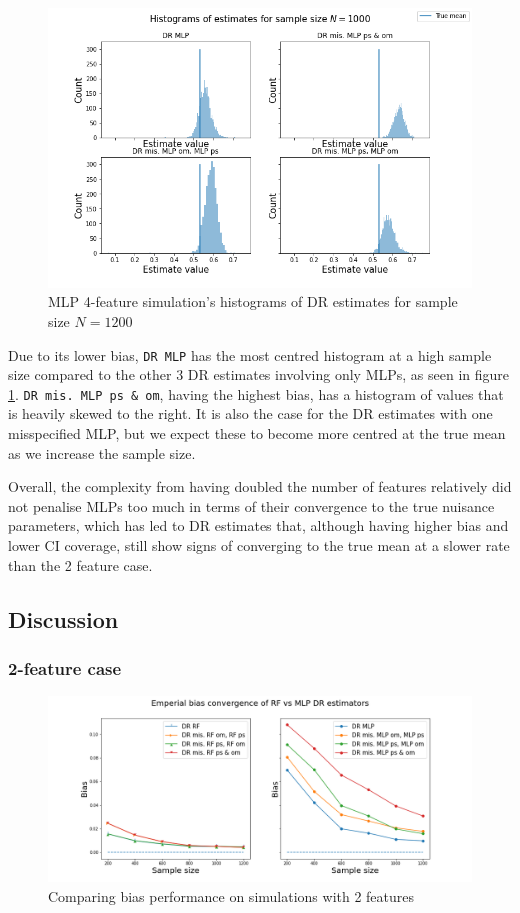 \documentclass[12pt,twoside]{article}
\begin{document}
\begin{figure}[h!]
    \centering
    \includegraphics[width = 0.9\columnwidth]{figures/histMLP_moreW.png}
    \caption{MLP 4-feature simulation's histograms of DR estimates for sample size $N = 1200$}
    \label{fighistMLP_moreW}
\end{figure}

Due to its lower bias, \texttt{DR MLP} has the most centred histogram at a high sample size compared to the other 3 DR estimates involving only MLPs, as seen in figure \ref{fighistMLP_moreW}. \texttt{DR mis. MLP ps \& om}, having the highest bias, has a histogram of values that is heavily skewed to the right. It is also the case for the DR estimates with one misspecified MLP, but we expect these to become more centred at the true mean as we increase the sample size.

Overall, the complexity from having doubled the number of features relatively did not penalise MLPs too much in terms of their convergence to the true nuisance parameters, which has led to DR estimates that, although having higher bias and lower CI coverage, still show signs of converging to the true mean at a slower rate than the 2 feature case.
\clearpage
\subsection{Discussion}

\subsubsection{2-feature case} \label{2 features}

\begin{figure}[h!]
    \centering
    \includegraphics[width = 0.9\columnwidth]{figures/biascompare.png}
    \caption{Comparing bias performance on simulations with 2 features}
    \label{biascompare}
\end{figure}
\end{document}
